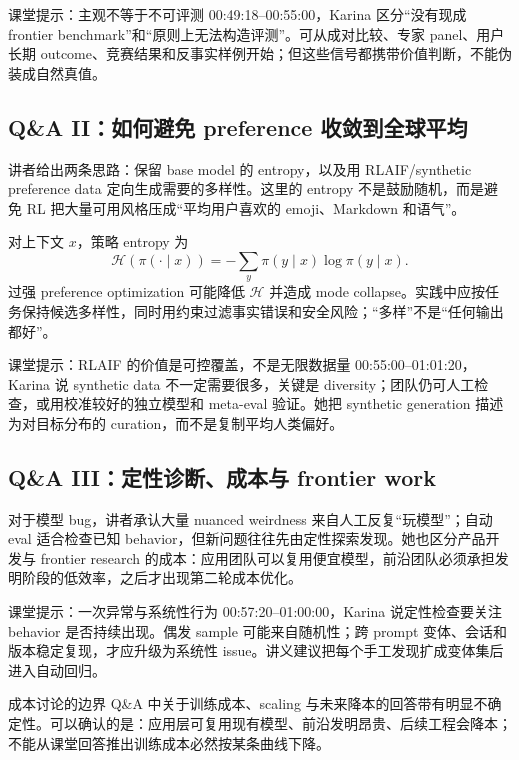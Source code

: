 \documentclass[a4paper]{article}
\begin{document}
\begin{knowledgebox}{课堂提示：主观不等于不可评测}
00:49:18--00:55:00，Karina 区分“没有现成 frontier benchmark”和“原则上无法构造评测”。可从成对比较、专家 panel、用户长期 outcome、竞赛结果和反事实样例开始；但这些信号都携带价值判断，不能伪装成自然真值。
\end{knowledgebox}

\subsection{Q\&A II：如何避免 preference 收敛到全球平均}

讲者给出两条思路：保留 base model 的 entropy，以及用 RLAIF/synthetic preference data 定向生成需要的多样性。这里的 entropy 不是鼓励随机，而是避免 RL 把大量可用风格压成“平均用户喜欢的 emoji、Markdown 和语气”。

对上下文 $x$，策略 entropy 为
\[
\mathcal{H}(\pi(\cdot\mid x))=-\sum_y \pi(y\mid x)\log \pi(y\mid x).
\]
过强 preference optimization 可能降低 $\mathcal{H}$ 并造成 mode collapse。实践中应按任务保持候选多样性，同时用约束过滤事实错误和安全风险；“多样”不是“任何输出都好”。

\begin{importantbox}{课堂提示：RLAIF 的价值是可控覆盖，不是无限数据量}
00:55:00--01:01:20，Karina 说 synthetic data 不一定需要很多，关键是 diversity；团队仍可人工检查，或用校准较好的独立模型和 meta-eval 验证。她把 synthetic generation 描述为对目标分布的 curation，而不是复制平均人类偏好。
\end{importantbox}

\subsection{Q\&A III：定性诊断、成本与 frontier work}

对于模型 bug，讲者承认大量 nuanced weirdness 来自人工反复“玩模型”；自动 eval 适合检查已知 behavior，但新问题往往先由定性探索发现。她也区分产品开发与 frontier research 的成本：应用团队可以复用便宜模型，前沿团队必须承担发明阶段的低效率，之后才出现第二轮成本优化。

\begin{knowledgebox}{课堂提示：一次异常与系统性行为}
00:57:20--01:00:00，Karina 说定性检查要关注 behavior 是否持续出现。偶发 sample 可能来自随机性；跨 prompt 变体、会话和版本稳定复现，才应升级为系统性 issue。讲义建议把每个手工发现扩成变体集后进入自动回归。
\end{knowledgebox}

\begin{warningbox}{成本讨论的边界}
Q\&A 中关于训练成本、scaling 与未来降本的回答带有明显不确定性。可以确认的是：应用层可复用现有模型、前沿发明昂贵、后续工程会降本；不能从课堂回答推出训练成本必然按某条曲线下降。
\end{warningbox}
\end{document}
